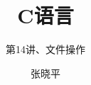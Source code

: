 \documentclass[11pt,notheorems]{beamer}
\begin{document}
\title{C语言}
\subtitle{第14讲、文件操作}
\author{张晓平}


\begin{frame}[plain]\transboxout
\titlepage
\end{frame}

\begin{frame}[allowframebreaks]\transboxin
\begin{center}
\tableofcontents[hideallsubsections]
\end{center}
\end{frame}


                  




% 
\end{document}
